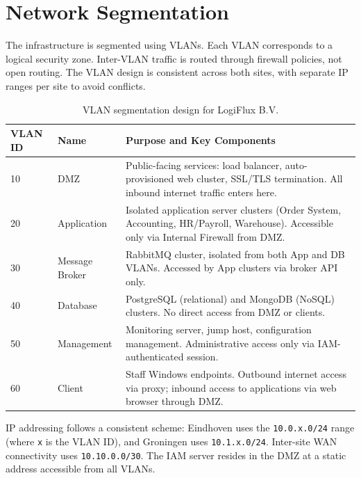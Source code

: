 \section{Network Segmentation}

The infrastructure is segmented using VLANs. Each VLAN corresponds to a logical security zone. Inter-VLAN traffic is routed through firewall policies, not open routing. The VLAN design is consistent across both sites, with separate IP ranges per site to avoid conflicts.

\begin{table}[ht]
\centering
\begin{tabularx}{\textwidth}{llX}
\toprule
\textbf{VLAN ID} & \textbf{Name} & \textbf{Purpose and Key Components} \\
\midrule
10 & DMZ & Public-facing services: load balancer, auto-provisioned web cluster, SSL/TLS termination. All inbound internet traffic enters here. \\
20 & Application & Isolated application server clusters (Order System, Accounting, HR/Payroll, Warehouse). Accessible only via Internal Firewall from DMZ. \\
30 & Message Broker & RabbitMQ cluster, isolated from both App and DB VLANs. Accessed by App clusters via broker API only. \\
40 & Database & PostgreSQL (relational) and MongoDB (NoSQL) clusters. No direct access from DMZ or clients. \\
50 & Management & Monitoring server, jump host, configuration management. Administrative access only via IAM-authenticated session. \\
60 & Client & Staff Windows endpoints. Outbound internet access via proxy; inbound access to applications via web browser through DMZ. \\
\bottomrule
\end{tabularx}
\caption{VLAN segmentation design for LogiFlux B.V.}
\label{tab:vlans}
\end{table}

IP addressing follows a consistent scheme: Eindhoven uses the \texttt{10.0.x.0/24} range (where \texttt{x} is the VLAN ID), and Groningen uses \texttt{10.1.x.0/24}. Inter-site WAN connectivity uses \texttt{10.10.0.0/30}. The IAM server resides in the DMZ at a static address accessible from all VLANs.

